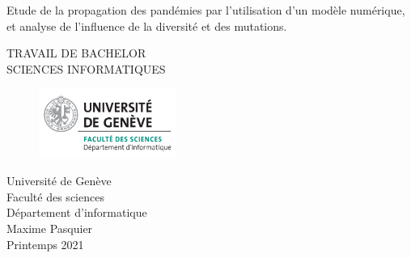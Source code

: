 \thispagestyle{empty}

\vspace*{+5em}
\begin{center}
Etude de la propagation des pandémies par l’utilisation d’un modèle numérique, \\ et analyse de l’influence de la diversité et des mutations. \\
\vspace*{+8em}

\vspace{+2em}
TRAVAIL DE BACHELOR\\
SCIENCES INFORMATIQUES\\

\vspace*{+3em}
\begin{figure}[H]
\centering
\includegraphics[width=0.4\textwidth]{Images/unige_csd.png}
\end{figure}

\vspace*{+3em}
Université de Genève\\
Faculté des sciences\\
Département d'informatique\\
\vspace*{+2em}
Maxime Pasquier\\

\vspace*{+12em}
Printemps 2021

\end{center}